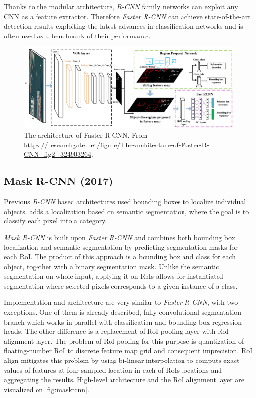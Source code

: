 \noindent Thanks to the modular architecture, \textit{R-CNN} family networks can exploit any CNN as a feature extractor.  Therefore \textit{Faster R-CNN} can achieve state-of-the-art detection results exploiting the latest advances in classification networks and is often used as a benchmark of their performance.
     

 \begin{figure}
     \centering
     \includegraphics[width=\textwidth]{img/fasterrcnn}
     \caption[Faster R-CNN architecture]%
     {The architecture of Faster R-CNN. From \url{https://researchgate.net/figure/The-architecture-of-Faster-R-CNN\_fig2\_324903264}.}
     \label{fig:fasterrcnn}
 \end{figure}

 \subsection{Mask R-CNN (2017)}
Previous \textit{R-CNN} based architectures used bounding boxes to localize individual objects. \citeauthor{bib:maskrcnn} \cite{bib:maskrcnn} adds a localization based on semantic segmentation, where the goal is to classify each pixel into a category. 

\textit{Mask R-CNN} is built upon \textit{Faster R-CNN} and combines both bounding box localization and semantic segmentation by predicting segmentation masks for each RoI. The product of this approach is a bounding box and class for each object, together with a binary segmentation mask. Unlike the semantic segmentation on whole input, applying it on RoIs allows for instantiated segmentation where selected pixels corresponds to a given instance of a class.

Implementation and architecture are very similar to \textit{Faster R-CNN}, with two exceptions. One of them is already described, fully convolutional segmentation branch which works in parallel with classification and bounding box regression heads. The other difference is a replacement of RoI pooling layer with RoI alignment layer. The problem of RoI pooling for this purpose is quantization of floating-number RoI to discrete feature map grid and consequent imprecision. RoI align mitigates this problem by using bi-linear interpolation to compute exact values of features at four sampled location in each of RoIs locations and aggregating the results. High-level architecture and the RoI alignment layer are visualized on \cref{fig:maskrcnn}.

